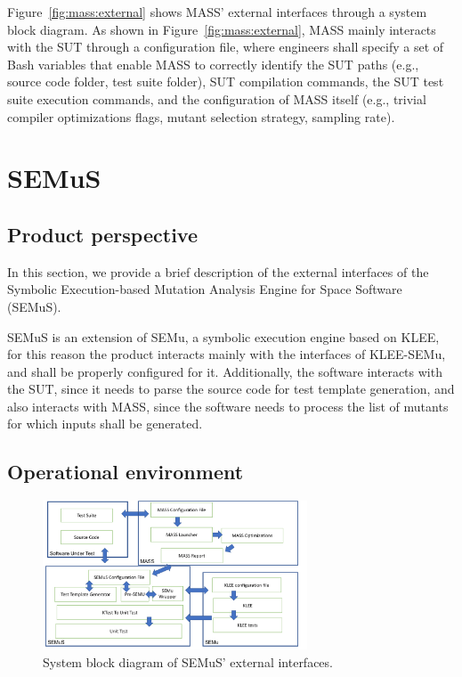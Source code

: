 Figure~\ref{fig:mass:external} shows MASS' external interfaces through a system block diagram.
As shown in Figure~\ref{fig:mass:external}, MASS mainly interacts with the SUT through a configuration file, where engineers shall specify a set of Bash variables that enable MASS to correctly identify the SUT paths (e.g., source code folder, test suite folder), SUT compilation commands, the SUT test suite execution commands, and the configuration of MASS itself (e.g., trivial compiler optimizations flags, mutant selection strategy, sampling rate).



\section{SEMuS}

\subsection{Product perspective}

In this section, we provide a brief description of the external interfaces of the Symbolic Execution-based Mutation Analysis Engine for Space Software (SEMuS).

SEMuS is an extension of SEMu, a symbolic execution engine based on KLEE, for this reason the product interacts mainly with the interfaces of KLEE-SEMu, and shall be properly configured for it. Additionally, the software interacts with the SUT, since it needs to parse the source code for test template generation, and also interacts with MASS, since the software needs to process the list of mutants for which inputs shall be generated.


\subsection{Operational environment}

\begin{figure}[t]
  \centering
  \includegraphics[width=0.7\textwidth]{images/semus-external.pdf}
      \caption{System block diagram of SEMuS' external interfaces.}
      \label{fig:semus:external}
\end{figure}

